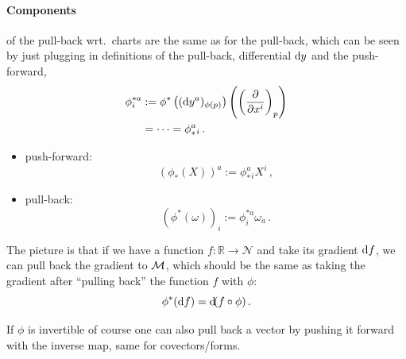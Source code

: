 \documentclass[11pt, a4paper, twocolumn]{article} %
\begin{document}
\paragraph{Components} of the pull-back wrt.\ charts are the same as for the pull-back,
which can be seen by just plugging in definitions of the pull-back, differential $\operatorname{d\!} y$
and the push-forward,
\begin{align}
    \phi^{*a}_i &:= \phi^*\left( (\operatorname{d\!} y^a)_{\phi(p)} \right)\left( \left( \frac{\partial}{\partial x^i} \right)_p \right)\\
    &= \cdots = \phi_*^a{}_i\,.
\end{align}
\begin{itemize}
    \item push-forward:
        \begin{equation}
            \left( \phi_*(X) \right)^a := \phi_*^a{}_i X^i\,,
        \end{equation}
    \item pull-back:
        \begin{equation}
            \left( \phi^*(\omega) \right)_i := \phi^{*a}_i \omega_a\,.
        \end{equation}
\end{itemize}
\begin{note}
    The picture is that if we have a function $f: \mathbb{R}\to \mathcal{N}$
    and take its gradient $\operatorname{d\!} f$, we can pull back the gradient to $\mathcal{M}$,
    which should be the same as taking the gradient after ``pulling back''
    the function $f$ with $\phi$:
    \begin{equation}
        \phi^*(\operatorname{d\!} f) = \operatorname{d\!} (f\circ \phi)\,.
    \end{equation}
\end{note}
\begin{center}
\end{center}

\begin{note}
    If $\phi$ is invertible of course one can also pull back a vector
    by pushing it forward with the inverse map, same for covectors/forms. 
\end{note}
\end{document}
